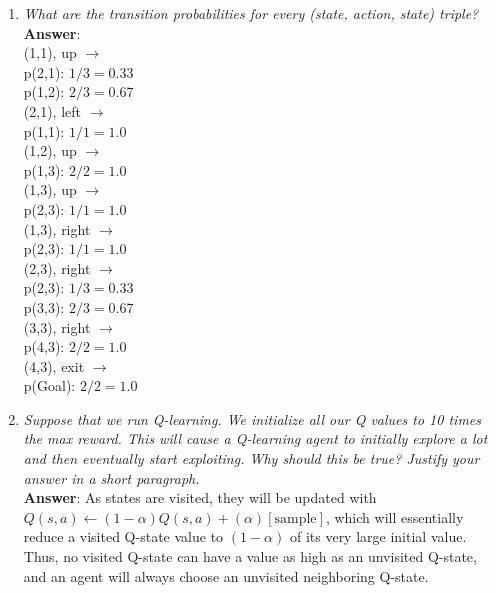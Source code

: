 \documentclass[fleqn]{hw5}
\begin{document}
\begin{enumerate}
\item \textit{What are the transition probabilities for every (state, action, state) triple?}\\
\textbf{Answer}:\\
(1,1), up $\rightarrow$\\
\hspace{5 em} p(2,1): $1/3=0.33$ \\
\hspace{5 em} p(1,2): $2/3=0.67$ \\
(2,1), left $\rightarrow$\\
\hspace{5 em} p(1,1): $1/1=1.0$\\
(1,2), up $\rightarrow$\\
\hspace{5 em} p(1,3): $2/2=1.0$\\
(1,3), up $\rightarrow$\\
\hspace{5 em} p(2,3): $1/1=1.0$\\
(1,3), right $\rightarrow$\\
\hspace{5 em} p(2,3): $1/1=1.0$\\
(2,3), right $\rightarrow$\\ 
\hspace{5 em} p(2,3): $1/3=0.33$ \\
\hspace{5 em} p(3,3): $2/3=0.67$ \\
(3,3), right $\rightarrow$\\ 
\hspace{5 em} p(4,3): $2/2=1.0$ \\
(4,3), exit $\rightarrow$\\ 
\hspace{5 em} p(Goal): $2/2=1.0$ \\



\item \textit{Suppose that we run Q-learning.  We initialize all
our Q values to 10 times the max reward.  This will cause a
Q-learning agent to initially explore a lot and then eventually start
exploiting.  Why should this be true?  Justify your answer in a short
paragraph.}\\
\textbf{Answer}: As states are visited, they will be updated with $Q(s,a)\leftarrow(1-\alpha)Q(s,a)+(\alpha)[\text{sample}]$,
which will essentially reduce a visited Q-state value to $(1-\alpha)$ of its very large initial value. Thus, no visited Q-state 
can have a value as high as an unvisited Q-state, and an agent will always choose an unvisited neighboring Q-state.
\end{enumerate}
\end{document}
